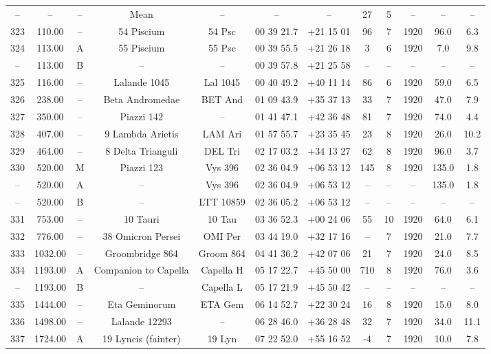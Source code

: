 \begin{table}
\begin{tabular}{cccccccccccc}
-- & -- & -- & Mean & -- & -- & -- & 27 & 5 & -- & -- & -- \\
323 & 110.00 & -- & 54 Piscium & 54 Psc & 00 39 21.7 & +21 15 01 & 96 & 7 & 1920 & 96.0 & 6.3 \\
324 & 113.00 & A & 55 Piscium & 55 Psc & 00 39 55.5 & +21 26 18 & 3 & 6 & 1920 & 7.0 & 9.8 \\
-- & 113.00 & B & -- & -- & 00 39 57.8 & +21 25 58 & -- & -- & -- & -- & -- \\
325 & 116.00 & -- & Lalande 1045 & Lal 1045 & 00 40 49.2 & +40 11 14 & 86 & 6 & 1920 & 59.0 & 6.5 \\
326 & 238.00 & -- & Beta Andromedae & BET And & 01 09 43.9 & +35 37 13 & 33 & 7 & 1920 & 47.0 & 7.9 \\
327 & 350.00 & -- & Piazzi 142 & -- & 01 41 47.1 & +42 36 48 & 81 & 7 & 1920 & 74.0 & 4.4 \\
328 & 407.00 & -- & 9 Lambda Arietis & LAM Ari & 01 57 55.7 & +23 35 45 & 23 & 8 & 1920 & 26.0 & 10.2 \\
329 & 464.00 & -- & 8 Delta Trianguli & DEL Tri & 02 17 03.2 & +34 13 27 & 62 & 8 & 1920 & 96.0 & 3.7 \\
330 & 520.00 & M & Piazzi 123 & Vys 396 & 02 36 04.9 & +06 53 12 & 145 & 8 & 1920 & 135.0 & 1.8 \\
-- & 520.00 & A & -- & Vys 396 & 02 36 04.9 & +06 53 12 & -- & -- & -- & 135.0 & 1.8 \\
-- & 520.00 & B & -- & LTT 10859 & 02 36 05.2 & +06 53 12 & -- & -- & -- & -- & -- \\
331 & 753.00 & -- & 10 Tauri & 10 Tau & 03 36 52.3 & +00 24 06 & 55 & 10 & 1920 & 64.0 & 6.1 \\
332 & 776.00 & -- & 38 Omicron Persei & OMI Per & 03 44 19.0 & +32 17 16 & -- & 7 & 1920 & 21.0 & 7.7 \\
333 & 1032.00 & -- & Groombridge 864 & Groom 864 & 04 41 36.2 & +42 07 06 & 21 & 7 & 1920 & 24.0 & 8.5 \\
334 & 1193.00 & A & Companion to Capella & Capella H & 05 17 22.7 & +45 50 00 & 710 & 8 & 1920 & 76.0 & 3.6 \\
-- & 1193.00 & B & -- & Capella L & 05 17 21.9 & +45 50 42 & -- & -- & -- & -- & -- \\
335 & 1444.00 & -- & Eta Geminorum & ETA Gem & 06 14 52.7 & +22 30 24 & 16 & 8 & 1920 & 15.0 & 8.0 \\
336 & 1498.00 & -- & Lalande 12293 & -- & 06 28 46.0 & +36 28 48 & 32 & 7 & 1920 & 34.0 & 11.1 \\
337 & 1724.00 & A & 19 Lyncis (fainter) & 19 Lyn & 07 22 52.0 & +55 16 52 & -4 & 7 & 1920 & 10.0 & 7.8 \\

\end{tabular}
\end{table}
